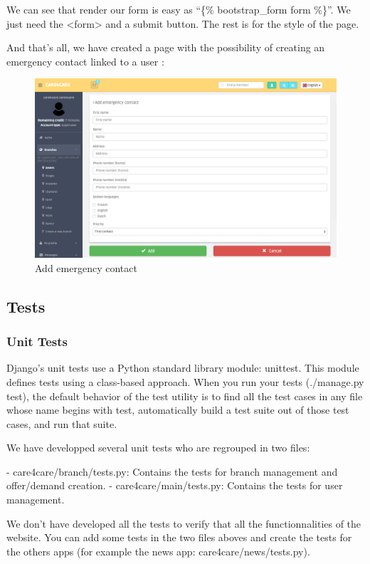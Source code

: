 \documentclass[11pt, a4paper]{article}      %
\begin{document}
We can see that render our form is easy as ``\{\% bootstrap\_form form \%\}''. We just need the <form> and a submit button. The rest is for the style of the page.

And that's all, we have created a page with the possibility of creating an emergency contact linked to a user :

\begin{figure}[!ht]
   \includegraphics[width=\linewidth]{addec.png}
   \caption{Add emergency contact}
\end{figure}





\subsection{Tests}
\subsubsection{Unit Tests}

Django’s unit tests use a Python standard library module: unittest. This module defines tests using a class-based approach. When you run your tests (./manage.py test), the default behavior of the test utility is to find all the test cases in any file whose name begins with test, automatically build a test suite out of those test cases, and run that suite.

We have developped several unit tests who are regrouped in two files:

- care4care/branch/tests.py: Contains the tests for branch management and offer/demand creation.
- care4care/main/tests.py: Contains the tests for user management.

We don't have developed all the tests to verify that all the functionnalities of the website. You can add some tests in the two files aboves and create the tests for the others apps (for example the news app: care4care/news/tests.py).
\end{document}
